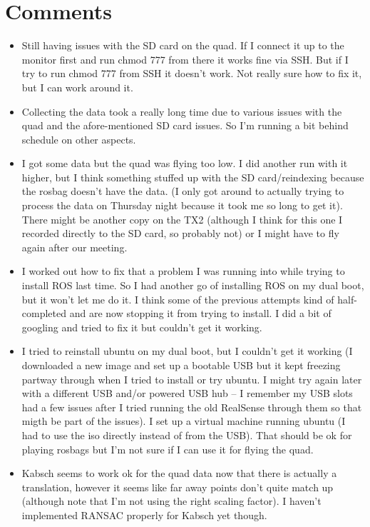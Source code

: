 \documentclass[12pt,a4paper]{article}
\begin{document}
\section{Comments}
\begin{itemize}
\item Still having issues with the SD card on the quad. If I connect it up to the monitor first and run chmod 777 from there it works fine via SSH. But if I try to run chmod 777 from SSH it doesn't work. Not really sure how to fix it, but I can work around it. 
\item Collecting the data took a really long time due to various issues with the quad and the afore-mentioned SD card issues. So I'm running a bit behind schedule on other aspects. 
\item I got some data but the quad was flying too low. I did another run with it higher, but I think something stuffed up with the SD card/reindexing because the rosbag doesn't have the data. (I only got around to actually trying to process the data on Thursday night because it took me so long to get it). There might be another copy on the TX2 (although I think for this one I recorded directly to the SD card, so probably not) or I might have to fly again after our meeting.
\item I worked out how to fix that a problem I was running into while trying to install ROS last time. So I had another go of installing ROS on my dual boot, but it won't let me do it. I think some of the previous attempts kind of half-completed and are now stopping it from trying to install. I did a bit of googling and tried to fix it but couldn't get it working.
\item I tried to reinstall ubuntu on my dual boot, but I couldn't get it working (I downloaded a new image and set up a bootable USB but it kept freezing partway through when I tried to install or try ubuntu. I might try again later with a different USB and/or powered USB hub -- I remember my USB slots had a few issues after I tried running the old RealSense through them so that migth be part of the issues). I set up a virtual machine running ubuntu (I had to use the iso directly instead of from the USB). That should be ok for playing rosbags but I'm not sure if I can use it for flying the quad.
\item Kabsch seems to work ok for the quad data now that there is actually a translation, however it seems like far away points don't quite match up (although note that I'm not using the right scaling factor). I haven't implemented RANSAC properly for Kabsch yet though.

\end{itemize}
\end{document}
